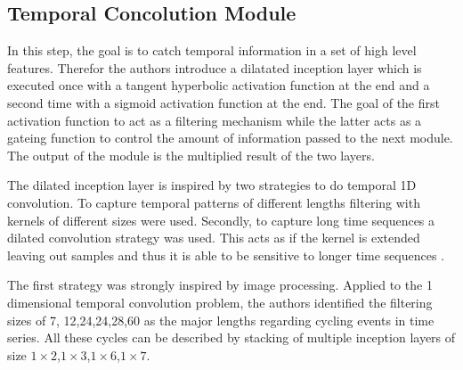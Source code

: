 \documentclass[letterpaper,twocolumn,12pt]{article}
\begin{document}
    \subsection{Temporal Concolution Module}
    In this step, the goal is to catch temporal information in a set of high level features.
    Therefor the authors introduce a dilatated inception layer which is executed once with a tangent hyperbolic activation function at the end
    and a second time with a sigmoid activation function at the end.
    The goal of the first activation function to act as a filtering mechanism while the latter acts as a gateing function
    to control the amount of information passed to the next module.
    The output of the module is the multiplied result of the two layers.

    The dilated inception layer is inspired by two strategies to do temporal 1D convolution.
    To capture temporal patterns of different lengths filtering with kernels of different sizes were used.
    Secondly, to capture long time sequences a dilated convolution strategy was used.
    This acts as if the kernel is extended leaving out samples and thus it is able to be sensitive to longer time sequences \cite{xi2018deep}.

    The first strategy was strongly inspired by image processing.
    Applied to the 1 dimensional temporal convolution problem, the authors identified the filtering sizes of 7, 12,24,24,28,60
    as the major lengths regarding cycling events in time series.
    All these cycles can be described by stacking of multiple inception layers of size $1 \times 2$,$1 \times 3$,$1 \times 6$,$1 \times 7$.
\end{document}
